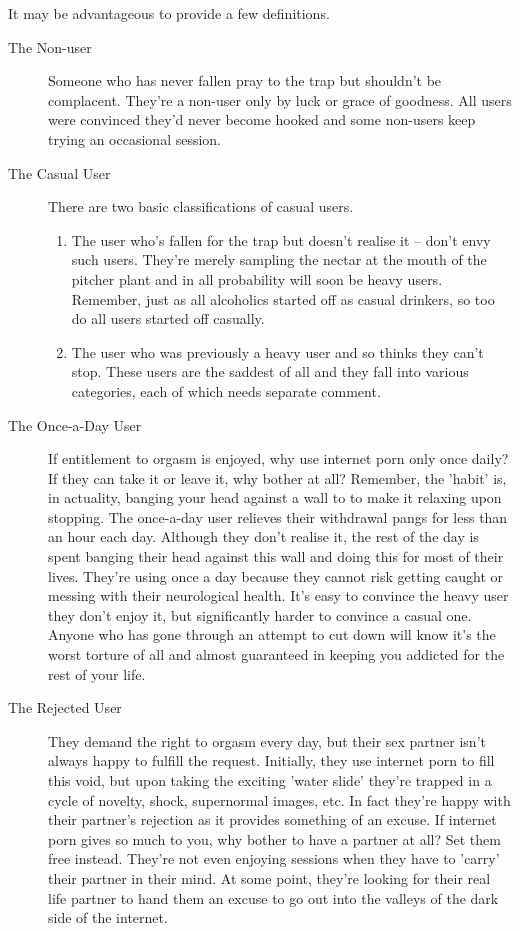 \documentclass[easypeasy]{subfiles}
\begin{document}
It may be advantageous to provide a few definitions.
 \begin{description} 
   \item [The Non-user] Someone who has never fallen pray to the trap but shouldn't be complacent. They're a non-user only by luck or grace of goodness. All users were convinced they'd never become hooked and some non-users keep trying an occasional session.

   \item [The Casual User] There are two basic classifications of casual users.
\begin{enumerate}
\item The user who's fallen for the trap but doesn't realise it -- don't envy such users. They're merely sampling the nectar at the mouth of the pitcher plant and in all probability will soon be heavy users. Remember, just as all alcoholics started off as casual drinkers, so too do all users started off casually.

\item The user who was previously a heavy user and so thinks they can't stop. These users are the saddest of all and they fall into various categories, each of which needs separate comment.
\end{enumerate}
    \item [The Once-a-Day User] If entitlement to orgasm is enjoyed, why use internet porn only once daily? If they can take it or leave it, why bother at all? Remember, the 'habit' is, in actuality, banging your head against a wall to to make it relaxing upon stopping. The once-a-day user relieves their withdrawal pangs for less than an hour each day. Although they don't realise it, the rest of the day is spent banging their head against this wall and doing this for most of their lives. They're using once a day because they cannot risk getting caught or messing with their neurological health. It's easy to convince the heavy user they don't enjoy it, but significantly harder to convince a casual one. Anyone who has gone through an attempt to cut down will know it's the worst torture of all and almost guaranteed in keeping you addicted for the rest of your life.

    \item [The Rejected User] They demand the right to orgasm every day, but their sex partner isn't always happy to fulfill the request. Initially, they use internet porn to fill this void, but upon taking the exciting 'water slide' they're trapped in a cycle of novelty, shock, supernormal images, etc. In fact they're happy with their partner's rejection as it provides something of an excuse. If internet porn gives so much to you, why bother to have a partner at all? Set them free instead. They're not even enjoying sessions when they have to 'carry' their partner in their mind. At some point, they're looking for their real life partner to hand them an excuse to go out into the valleys of the dark side of the internet.


\end{description}
\end{document}
